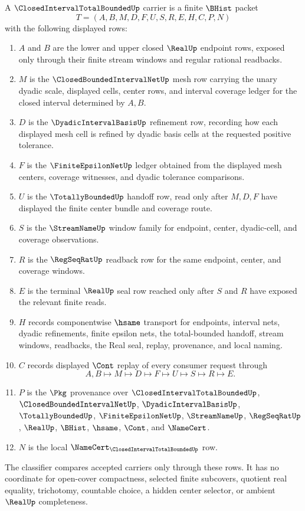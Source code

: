 \begin{definition}
\label{def:closed-interval-total-bounded-carrier}
A $\ClosedIntervalTotalBoundedUp$ carrier is a finite $\BHist$ packet
$$
T=(A,B,M,D,F,U,S,R,E,H,C,P,N)
$$
with the following displayed rows:
\begin{enumerate}
\item $A$ and $B$ are the lower and upper closed $\RealUp$ endpoint rows, exposed only through their finite stream windows and regular rational readbacks.
\item $M$ is the $\ClosedBoundedIntervalNetUp$ mesh row carrying the unary dyadic scale, displayed cells, center rows, and interval coverage ledger for the closed interval determined by $A,B$.
\item $D$ is the $\DyadicIntervalBasisUp$ refinement row, recording how each displayed mesh cell is refined by dyadic basis cells at the requested positive tolerance.
\item $F$ is the $\FiniteEpsilonNetUp$ ledger obtained from the displayed mesh centers, coverage witnesses, and dyadic tolerance comparisons.
\item $U$ is the $\TotallyBoundedUp$ handoff row, read only after $M,D,F$ have displayed the finite center bundle and coverage route.
\item $S$ is the $\StreamNameUp$ window family for endpoint, center, dyadic-cell, and coverage observations.
\item $R$ is the $\RegSeqRatUp$ readback row for the same endpoint, center, and coverage windows.
\item $E$ is the terminal $\RealUp$ seal row reached only after $S$ and $R$ have exposed the relevant finite reads.
\item $H$ records componentwise $\hsame$ transport for endpoints, interval nets, dyadic refinements, finite epsilon nets, the total-bounded handoff, stream windows, readbacks, the Real seal, replay, provenance, and local naming.
\item $C$ records displayed $\Cont$ replay of every consumer request through
$$
A,B\longmapsto M\longmapsto D\longmapsto F\longmapsto U\longmapsto S\longmapsto R\longmapsto E .
$$
\item $P$ is the $\Pkg$ provenance over $\ClosedIntervalTotalBoundedUp$, $\ClosedBoundedIntervalNetUp$, $\DyadicIntervalBasisUp$, $\TotallyBoundedUp$, $\FiniteEpsilonNetUp$, $\StreamNameUp$, $\RegSeqRatUp$, $\RealUp$, $\BHist$, $\hsame$, $\Cont$, and $\NameCert$.
\item $N$ is the local $\NameCert_{\ClosedIntervalTotalBoundedUp}$ row.
\end{enumerate}
The classifier compares accepted carriers only through these rows. It has no coordinate for open-cover compactness, selected finite subcovers, quotient real equality, trichotomy, countable choice, a hidden center selector, or ambient $\RealUp$ completeness.
\end{definition}

